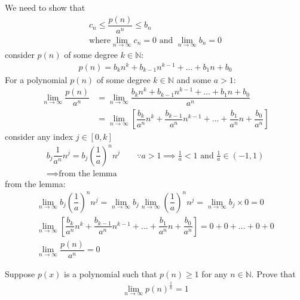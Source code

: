 \documentclass[12pt]{book}
\theoremstyle{definition}
\begin{document}
\begin{sol}

We need to show that
\begingroup
\addtolength{\jot}{1em}
\begin{align*}
c_n	\leq \dfrac{p(n)}{a^n} \leq b_n \\
\text{where} \lim\limits_{n \to \infty}c_n =0 \text{ and }\lim\limits_{n \to \infty}b_n =0
\end{align*}
\endgroup
\noindent
consider $p(n)$ of some degree $k \in \mathbb{N}$:
\begin{align*}
p(n) = b_kn^k + b_{k-1}n^{k-1}+ ... + b_1n+b_0 	
\end{align*}
\noindent
For a polynomial $p(n)$ of some degree $k \in \mathbb{N}$ and some $a >1$:
\begin{align*}
 \lim\limits_{n \to \infty}\dfrac{p(n)}{a^n} &=  \lim\limits_{n \to \infty}\dfrac{b_kn^k + b_{k-1}n^{k-1}+ ... + b_1n+b_0}{a^n}\\
 &=  \lim\limits_{n \to \infty} \left[ \dfrac{b_k}{a^n}n^k +\dfrac{b_{k-1}}{a^n}n^{k-1} +...+\dfrac{b_1}{a^n}n+\dfrac{b_0}{a^n} \right]
\end{align*}
consider any index $j \in [0,k]$
\begin{align*}
	b_j\dfrac{1}{a^n}n^j = b_j\left(\dfrac{1}{a}\right)^nn^j \qquad \because a>1 \implies \frac{1}{a} <1 \text{ and } \frac{1}{a} \in (-1,1)\\
	\implies \text{from the lemma}\end{align*}
from the lemma:
\begin{gather*}
	 \lim\limits_{n \to \infty}  b_j\left(\dfrac{1}{a}\right)^nn^j = \lim\limits_{n \to \infty}b_j \lim\limits_{n \to \infty} \left(\dfrac{1}{a}\right)^nn^j = \lim\limits_{n \to \infty}b_j \times 0 =0\\
	\lim\limits_{n \to \infty} \left[ \dfrac{b_k}{a^n}n^k +\dfrac{b_{k-1}}{a^n}n^{k-1} +...+\dfrac{b_1}{a^n}n+\dfrac{b_0}{a^n} \right] =0+0+...+0+0\\
	\lim\limits_{n \to \infty}\dfrac{p(n)}{a^n} =0
\end{gather*}


\end{sol}



\begin{ex}{1.13}
	Suppose $p(x)$ is a polynomial such that $p(n) \geq 1$ for any $n \in \mathbb{N}$. Prove that
\begin{align*}
\lim\limits_{n \to \infty} p(n)^{\frac{1}{n}} = 1
\end{align*}
 
\end{ex}
\end{document}
